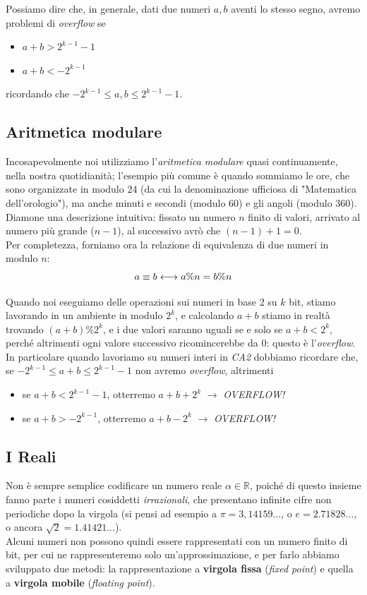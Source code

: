 \documentclass[class=book, crop=false]{standalone}
\begin{document}
Possiamo dire che, in generale, dati due numeri $a, b$ aventi lo stesso segno, avremo problemi di \emph{overflow} se
\begin{itemize}[noitemsep,nolistsep]
	\item $a+b>2^{k-1}-1$
	\item $a+b<-2^{k-1}$
\end{itemize}
ricordando che $-2^{k-1}\le a,b\le 2^{k-1}-1$.

\subsection{Aritmetica modulare} Incosapevolmente noi utilizziamo l'\emph{aritmetica modulare} quasi continuamente, nella nostra quotidianità; l'esempio più comune è quando sommiamo le ore, che sono organizzate in modulo 24 (da cui la denominazione ufficiosa di "Matematica dell'orologio"), ma anche minuti e secondi (modulo 60) e gli angoli (modulo 360).\\
Diamone una descrizione intuitiva: fissato un numero $n$ finito di valori, arrivato al numero più grande ($n-1$), al successivo avrò che $(n-1)+1=0$.\\
Per completezza, forniamo ora la relazione di equivalenza di due numeri in modulo $n$:\\
\begin{equation*}
\centering
a\equiv b \longleftrightarrow a\%n=b\%n
\end{equation*}

Quando noi eseguiamo delle operazioni sui numeri in base 2 su $k$ bit, stiamo lavorando in un ambiente in modulo $2^{k}$, e calcolando $a+b$ stiamo in realtà trovando $(a+b)\%2^{k}$, e i due valori saranno uguali se e solo se $a+b<2^{k}$, perché altrimenti ogni valore successivo ricomincerebbe da 0: questo è l'\emph{overflow}.\\
In particolare quando lavoriamo su numeri interi in \emph{CA2} dobbiamo ricordare che, se $-2^{k-1}\le a+b\le 2^{k-1}-1$ non avremo \emph{overflow}, altrimenti
\begin{itemize}[noitemsep,nolistsep]
	\item se $a+b<2^{k-1}-1$, otterremo $a+b+2^{k}$ $\longrightarrow$ \emph{OVERFLOW!}
	\item se $a+b>-2^{k-1}$, otterremo $a+b-2^{k}$ $\longrightarrow$ \emph{OVERFLOW!}
\end{itemize}

\subsection{I Reali} Non è sempre semplice codificare un numero reale $\alpha \in \mathbb{R}$, poiché di questo insieme fanno parte i numeri cosiddetti \emph{irrazionali}, che presentano infinite cifre non periodiche dopo la virgola (si pensi ad esempio a $\pi=3,14159...$, o $e=2.71828...$, o ancora $\sqrt{2}=1.41421...$).\\
Alcuni numeri non possono quindi essere rappresentati con un numero finito di bit, per cui ne rappresenteremo solo un'approssimazione, e per farlo abbiamo sviluppato due metodi: la rappresentazione a \textbf{virgola fissa} (\emph{fixed point}) e quella a \textbf{virgola mobile} (\emph{floating point}).
\end{document}
